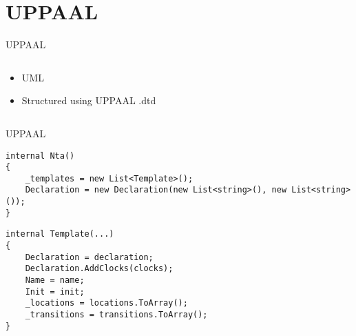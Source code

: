 \section{UPPAAL}
\begin{frame}{UPPAAL}
    \begin{columns}
        \begin{column}{0.4\textwidth}
            \begin{itemize}
                \item UML
                \item Structured using UPPAAL .dtd
            \end{itemize}
        \end{column}
        \begin{column}{0.6\textwidth}
            \scalebox{0.8}{
                
            }
        \end{column}
    \end{columns}

\end{frame}
\begin{frame}[fragile]{UPPAAL}

    \begin{lstlisting}
internal Nta()
{
    _templates = new List<Template>();
    Declaration = new Declaration(new List<string>(), new List<string>());
}    
    \end{lstlisting}
    \vspace{1em}
    \begin{lstlisting}
internal Template(...)
{
    Declaration = declaration;
    Declaration.AddClocks(clocks);
    Name = name;
    Init = init;
    _locations = locations.ToArray();
    _transitions = transitions.ToArray();
}  
    \end{lstlisting}
\end{frame}

